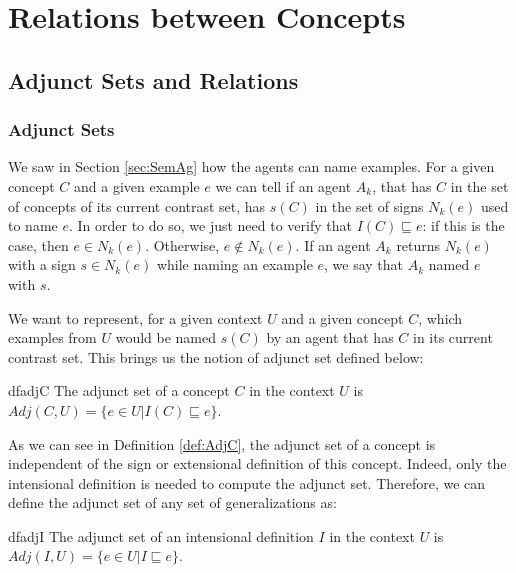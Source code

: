 \section{Relations between Concepts}


\subsection{Adjunct Sets and Relations}\label{sec:Adj&Relations}

\subsubsection{Adjunct Sets}\label{sec:Adj}

We saw in Section \ref{sec:SemAg} how the agents can name examples. For a given concept $C$ and a given example $e$ we can tell if an agent $A_{k}$, that has $C$ in the set of concepts of its current contrast set, has $s(C)$ in the set of signs $N_{k}(e)$ used to name $e$. In order to do so, we just need to verify that $I(C) \sqsubseteq e$: if this is the case, then $e \in N_{k}(e)$. Otherwise, $e \not \in N_{k}(e)$. If an agent $A_{k}$ returns $N_{k}(e)$ with a sign $s \in N_{k}(e)$ while naming an example $e$, we say that $A_{k}$ named $e$ with $s$.

We want to represent, for a given context $U$ and a given concept $C$, which examples from $U$ would be named $s(C)$ by an agent that has $C$ in its current contrast set. This brings us the notion of adjunct set defined below:

\begin{restatable}{df}{adjC}
\label{def:AdjC}
The adjunct set of a concept $C$ in the context $U$ is  $Adj(C,U) = \{ e \in U | I(C) \sqsubseteq e \}$. 
\end{restatable}

As we can see in Definition \ref{def:AdjC}, the adjunct set of a concept is independent of the sign or extensional definition of this concept. Indeed, only the intensional definition is needed to compute the adjunct set. Therefore, we can define the adjunct set of any set of generalizations as:

\begin{restatable}{df}{adjI}
\label{def:AdjI}
The adjunct set of an intensional definition $I$ in the context $U$ is  $Adj(I,U) = \{ e \in U | I \sqsubseteq e \}$. 
\end{restatable}

